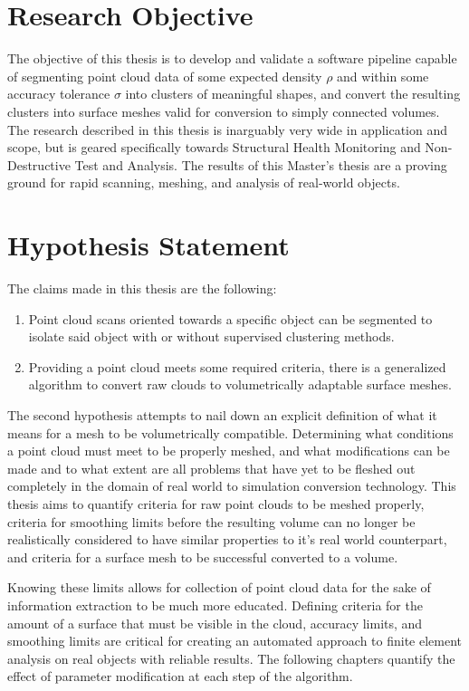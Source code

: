 \documentclass[12pt]{drexelthesis}
\let\Oldsection\section
\renewcommand{\section}{\FloatBarrier\Oldsection}
\begin{document}
\section{Research Objective}
The objective of this thesis is to develop and validate a software pipeline capable of segmenting point cloud data of some expected density $\rho$ and within some accuracy tolerance $\sigma$ into clusters of meaningful shapes, and convert the resulting clusters into surface meshes valid for conversion to simply connected volumes. The research described in this thesis is inarguably very wide in application and scope, but is geared specifically towards Structural Health Monitoring and Non-Destructive Test and Analysis. The results of this Master's thesis are a proving ground for rapid scanning, meshing, and analysis of real-world objects.

\section{Hypothesis Statement}
The claims made in this thesis are the following:

\begin{enumerate}
	\item Point cloud scans oriented towards a specific object can be segmented to isolate said object with or without supervised clustering methods.
	\item Providing a point cloud meets some required criteria, there is a generalized algorithm to convert raw clouds to volumetrically adaptable surface meshes.
\end{enumerate}

The second hypothesis attempts to nail down an explicit definition of what it means for a mesh to be volumetrically compatible. Determining what conditions a point cloud must meet to be properly meshed, and what modifications can be made and to what extent are all problems that have yet to be fleshed out completely in the domain of real world to simulation conversion technology. This thesis aims to quantify criteria for raw point clouds to be meshed properly, criteria for smoothing limits before the resulting volume can no longer be realistically considered to have similar properties to it's real world counterpart, and criteria for a surface mesh to be successful converted to a volume. 

Knowing these limits allows for collection of point cloud data for the sake of information extraction to be much more educated. Defining criteria for the amount of a surface that must be visible in the cloud, accuracy limits, and smoothing limits are critical for creating an automated approach to finite element analysis on real objects with reliable results. The following chapters quantify the effect of parameter modification at each step of the algorithm.
\end{document}
